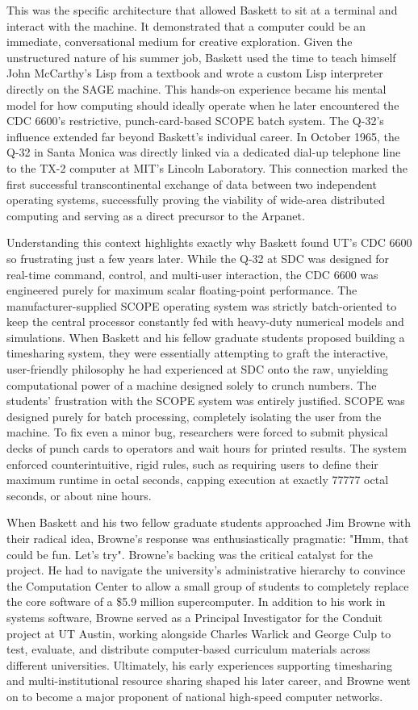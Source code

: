 This was the specific architecture that allowed Baskett to sit at a terminal and interact with the machine. It demonstrated that a computer could be an immediate, conversational medium for creative exploration. Given the unstructured nature of his summer job, Baskett used the time to teach himself John McCarthy’s Lisp from a textbook and wrote a custom Lisp interpreter directly on the SAGE machine. This hands-on experience became his mental model for how computing should ideally operate when he later encountered the CDC 6600's restrictive, punch-card-based SCOPE batch system. The Q-32's influence extended far beyond Baskett's individual career. In October 1965, the Q-32 in Santa Monica was directly linked via a dedicated dial-up telephone line to the TX-2 computer at MIT's Lincoln Laboratory. This connection marked the first successful transcontinental exchange of data between two independent operating systems, successfully proving the viability of wide-area distributed computing and serving as a direct precursor to the Arpanet.

Understanding this context highlights exactly why Baskett found UT's CDC 6600 so frustrating just a few years later. While the Q-32 at SDC was designed for real-time command, control, and multi-user interaction, the CDC 6600 was engineered purely for maximum scalar floating-point performance. The manufacturer-supplied SCOPE operating system was strictly batch-oriented to keep the central processor constantly fed with heavy-duty numerical models and simulations. When Baskett and his fellow graduate students proposed building a timesharing system, they were essentially attempting to graft the interactive, user-friendly philosophy he had experienced at SDC onto the raw, unyielding computational power of a machine designed solely to crunch numbers. The students' frustration with the SCOPE system was entirely justified. SCOPE was designed purely for batch processing, completely isolating the user from the machine. To fix even a minor bug, researchers were forced to submit physical decks of punch cards to operators and wait hours for printed results. The system enforced counterintuitive, rigid rules, such as requiring users to define their maximum runtime in octal seconds, capping execution at exactly 77777 octal seconds, or about nine hours.

When Baskett and his two fellow graduate students approached Jim Browne with their radical idea, Browne's response was enthusiastically pragmatic: "Hmm, that could be fun. Let's try". Browne's backing was the critical catalyst for the project. He had to navigate the university's administrative hierarchy to convince the Computation Center to allow a small group of students to completely replace the core software of a \$5.9 million supercomputer. In addition to his work in systems software, Browne served as a Principal Investigator for the Conduit project at UT Austin, working alongside Charles Warlick and George Culp to test, evaluate, and distribute computer-based curriculum materials across different universities. Ultimately, his early experiences supporting timesharing and multi-institutional resource sharing shaped his later career, and Browne went on to become a major proponent of national high-speed computer networks.

